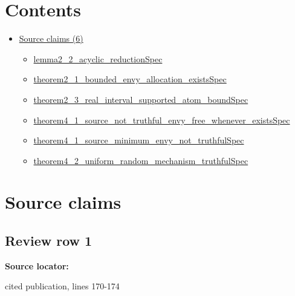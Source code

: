 \documentclass[10pt]{article}
\begin{document}
\section*{Contents}
\begin{itemize}[leftmargin=1.2em]
\item \hyperlink{source-section-f10b5f68e4acf3dc}{Source claims (6)}
\begin{itemize}[leftmargin=1.2em]
\item \hyperlink{source-claim-2458ea063371ccee}{lemma2\_\allowbreak{}2\_\allowbreak{}acyclic\_\allowbreak{}reduction\allowbreak{}Spec}
\item \hyperlink{source-claim-699685670f75744b}{theorem2\_\allowbreak{}1\_\allowbreak{}bounded\_\allowbreak{}envy\_\allowbreak{}allocation\_\allowbreak{}exists\allowbreak{}Spec}
\item \hyperlink{source-claim-488983f780b608da}{theorem2\_\allowbreak{}3\_\allowbreak{}real\_\allowbreak{}interval\_\allowbreak{}supported\_\allowbreak{}atom\_\allowbreak{}bound\allowbreak{}Spec}
\item \hyperlink{source-claim-87600c3a3d619cbf}{theorem4\_\allowbreak{}1\_\allowbreak{}source\_\allowbreak{}not\_\allowbreak{}truthful\_\allowbreak{}envy\_\allowbreak{}free\_\allowbreak{}whenever\_\allowbreak{}exists\allowbreak{}Spec}
\item \hyperlink{source-claim-b1ad798761a4903c}{theorem4\_\allowbreak{}1\_\allowbreak{}source\_\allowbreak{}minimum\_\allowbreak{}envy\_\allowbreak{}not\_\allowbreak{}truthful\allowbreak{}Spec}
\item \hyperlink{source-claim-41e9057437421225}{theorem4\_\allowbreak{}2\_\allowbreak{}uniform\_\allowbreak{}random\_\allowbreak{}mechanism\_\allowbreak{}truthful\allowbreak{}Spec}
\end{itemize}
\end{itemize}



\clearpage
\hypertarget{source-claim-2458ea063371ccee}{}
\hypertarget{source-section-f10b5f68e4acf3dc}{}
\section*{Source claims}
\subsection*{Review row 1}
\textbf{Source locator:} {\footnotesize\raggedright cited publication, lines 170-\allowbreak{}174\par}
\end{document}

